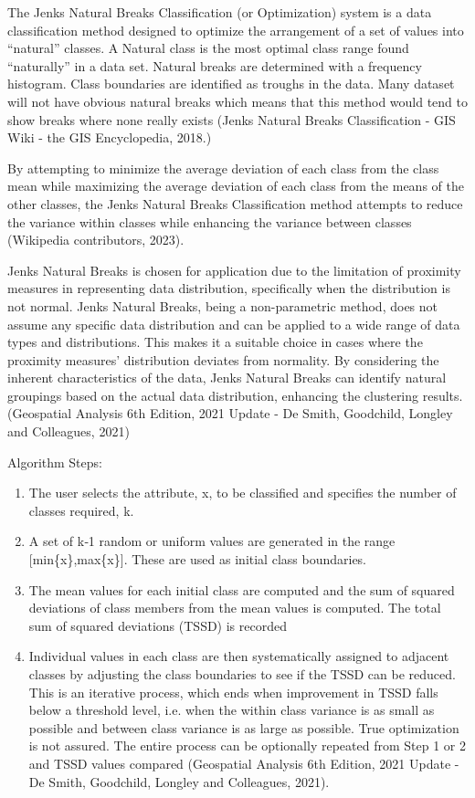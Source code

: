 \documentclass[11pt, a4paper]{article}
\begin{document}
The Jenks Natural Breaks Classification (or Optimization) system is a data classification method designed to optimize the arrangement of a set of values into ``natural'' classes. A Natural class is the most optimal class range found ``naturally'' in a data set. Natural breaks are determined with a frequency histogram. Class boundaries are identified as troughs in the data. Many dataset will not have obvious natural breaks which means that this method would tend to show breaks where none really exists (Jenks Natural Breaks Classification - GIS Wiki - the GIS Encyclopedia, 2018.)
\par
By attempting to minimize the average deviation of each class from the class mean while maximizing the average deviation of each class from the means of the other classes, the Jenks Natural Breaks Classification method attempts to reduce the variance within classes while enhancing the variance between classes (Wikipedia contributors, 2023).
\par
Jenks Natural Breaks is chosen for application due to the limitation of proximity measures in representing data distribution, specifically when the distribution is not normal. Jenks Natural Breaks, being a non-parametric method, does not assume any specific data distribution and can be applied to a wide range of data types and distributions. This makes it a suitable choice in cases where the proximity measures' distribution deviates from normality. By considering the inherent characteristics of the data, Jenks Natural Breaks can identify natural groupings based on the actual data distribution, enhancing the clustering results. (Geospatial Analysis 6th Edition, 2021 Update - De Smith, Goodchild, Longley and Colleagues, 2021)
\par
Algorithm Steps:
\begin{enumerate}
\item The user selects the attribute, x, to be classified and specifies the number of classes required, k.
\item A set of k‑1 random or uniform values are generated in the range [min\{x\},max\{x\}]. These are used as initial class boundaries.
\item The mean values for each initial class are computed and the sum of squared deviations of class members from the mean values is computed. The total sum of squared deviations (TSSD) is recorded
\item Individual values in each class are then systematically assigned to adjacent classes by adjusting the class boundaries to see if the TSSD can be reduced. This is an iterative process, which ends when improvement in TSSD falls below a threshold level, i.e. when the within class variance is as small as possible and between class variance is as large as possible. True optimization is not assured. The entire process can be optionally repeated from Step 1 or 2 and TSSD values compared (Geospatial Analysis 6th Edition, 2021 Update - De Smith, Goodchild, Longley and Colleagues, 2021).
\end{enumerate}
\end{document}
